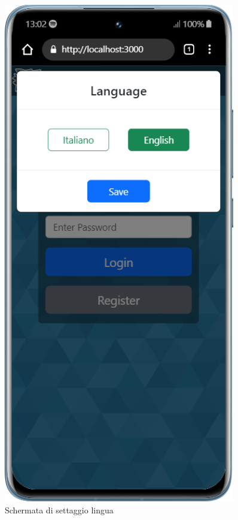 \begin{figure}[H]
    \centering
    \begin{minipage}{0.45\textwidth}
        \centering
        \includegraphics[width=0.9\textwidth]{img/screen/mobile/language_mobile.png}
        \caption{Schermata di settaggio lingua}
        \label{fig:language_mobile}
    \end{minipage}\hfill
\end{figure}